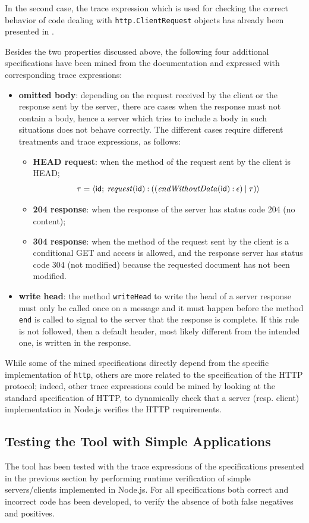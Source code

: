 In the second case, the trace expression which is used for checking the correct behavior of code dealing with
\lstinline{http.ClientRequest} objects has already been presented in .

Besides the two properties discussed above, the following four additional specifications have been mined from
the documentation and expressed with corresponding trace expressions:
\begin{itemize}
	\item \textbf{omitted body}: depending on the request received by the client or the response sent by the server, there are cases when the response must not contain a body, hence a server which tries to include a body in such situations does not behave correctly. The different cases require different treatments and trace expressions, as follows:
	\begin{itemize}
	  \item \textbf{HEAD request}: when the method of the request sent by the client is HEAD;
		\[ \tau = {\langle}\mathsf{\mathsf{id}};\:{\mathit{request}(\mathsf{id}) \mathbin{:} ((\mathit{endWithoutData}(\mathsf{id}) \mathbin{:} \epsilon) \mathbin{|} \tau)}{\rangle} \]
	  \item \textbf{204 response}: when the response of the server has status code 204 (no content);
	  \item \textbf{304 response}: when the method of the request sent by the client is a conditional GET and access is allowed, and the response server has status code 304 (not modified) because the requested document has not been modified.
	\end{itemize}
	\item \textbf{write head}: the method \lstinline{writeHead} to write the head of a server response must only be called once on a message and it must happen before the method \lstinline{end} is called to signal to the server that the response is complete. If this rule is not followed, then a default header, most likely different from the intended one, is written in the response.
\end{itemize}
While some of the mined specifications directly depend from the specific implementation of \lstinline{http}, others
are more related to the specification of the HTTP protocol; indeed, other trace expressions could be mined by looking at the
standard specification of HTTP, to dynamically check that a server (resp. client) implementation in Node.js verifies the HTTP
requirements.

\subsection{Testing the Tool with Simple Applications}
\label{sec:simple-test}
The tool has been tested with the trace expressions of the specifications presented in the previous section by performing
runtime verification of simple servers/clients implemented in Node.js.
For all specifications both correct and incorrect code has been developed, to verify the absence of both false negatives and positives.

